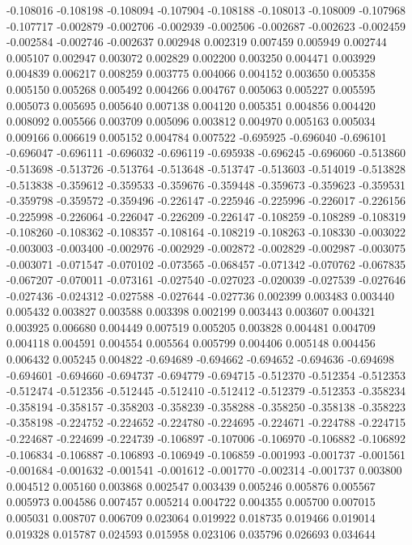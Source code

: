 -0.108016
-0.108198
-0.108094
-0.107904
-0.108188
-0.108013
-0.108009
-0.107968
-0.107717
-0.002879
-0.002706
-0.002939
-0.002506
-0.002687
-0.002623
-0.002459
-0.002584
-0.002746
-0.002637
0.002948
0.002319
0.007459
0.005949
0.002744
0.005107
0.002947
0.003072
0.002829
0.002200
0.003250
0.004471
0.003929
0.004839
0.006217
0.008259
0.003775
0.004066
0.004152
0.003650
0.005358
0.005150
0.005268
0.005492
0.004266
0.004767
0.005063
0.005227
0.005595
0.005073
0.005695
0.005640
0.007138
0.004120
0.005351
0.004856
0.004420
0.008092
0.005566
0.003709
0.005096
0.003812
0.004970
0.005163
0.005034
0.009166
0.006619
0.005152
0.004784
0.007522
-0.695925
-0.696040
-0.696101
-0.696047
-0.696111
-0.696032
-0.696119
-0.695938
-0.696245
-0.696060
-0.513860
-0.513698
-0.513726
-0.513764
-0.513648
-0.513747
-0.513603
-0.514019
-0.513828
-0.513838
-0.359612
-0.359533
-0.359676
-0.359448
-0.359673
-0.359623
-0.359531
-0.359798
-0.359572
-0.359496
-0.226147
-0.225946
-0.225996
-0.226017
-0.226156
-0.225998
-0.226064
-0.226047
-0.226209
-0.226147
-0.108259
-0.108289
-0.108319
-0.108260
-0.108362
-0.108357
-0.108164
-0.108219
-0.108263
-0.108330
-0.003022
-0.003003
-0.003400
-0.002976
-0.002929
-0.002872
-0.002829
-0.002987
-0.003075
-0.003071
-0.071547
-0.070102
-0.073565
-0.068457
-0.071342
-0.070762
-0.067835
-0.067207
-0.070011
-0.073161
-0.027540
-0.027023
-0.020039
-0.027539
-0.027646
-0.027436
-0.024312
-0.027588
-0.027644
-0.027736
0.002399
0.003483
0.003440
0.005432
0.003827
0.003588
0.003398
0.002199
0.003443
0.003607
0.004321
0.003925
0.006680
0.004449
0.007519
0.005205
0.003828
0.004481
0.004709
0.004118
0.004591
0.004554
0.005564
0.005799
0.004406
0.005148
0.004456
0.006432
0.005245
0.004822
-0.694689
-0.694662
-0.694652
-0.694636
-0.694698
-0.694601
-0.694660
-0.694737
-0.694779
-0.694715
-0.512370
-0.512354
-0.512353
-0.512474
-0.512356
-0.512445
-0.512410
-0.512412
-0.512379
-0.512353
-0.358234
-0.358194
-0.358157
-0.358203
-0.358239
-0.358288
-0.358250
-0.358138
-0.358223
-0.358198
-0.224752
-0.224652
-0.224780
-0.224695
-0.224671
-0.224788
-0.224715
-0.224687
-0.224699
-0.224739
-0.106897
-0.107006
-0.106970
-0.106882
-0.106892
-0.106834
-0.106887
-0.106893
-0.106949
-0.106859
-0.001993
-0.001737
-0.001561
-0.001684
-0.001632
-0.001541
-0.001612
-0.001770
-0.002314
-0.001737
0.003800
0.004512
0.005160
0.003868
0.002547
0.003439
0.005246
0.005876
0.005567
0.005973
0.004586
0.007457
0.005214
0.004722
0.004355
0.005700
0.007015
0.005031
0.008707
0.006709
0.023064
0.019922
0.018735
0.019466
0.019014
0.019328
0.015787
0.024593
0.015958
0.023106
0.035796
0.026693
0.034644
